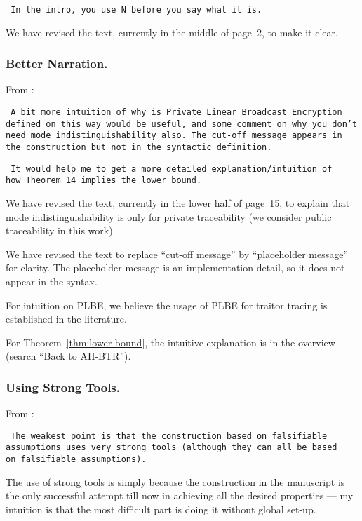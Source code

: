 \texttt{
In the intro, you use N before you say what it is.
}

We have revised the text,
currently in the middle of page~2,
to make it clear.

\subsubsection{Better Narration.}
From :

\texttt{
A bit more intuition of why is Private Linear Broadcast Encryption \\
defined on this way would be useful, and some comment on why you don't \\
need mode indistinguishability also. The cut-off message appears in \\
the construction but not in the syntactic definition.
}

\texttt{
It would help me to get a more detailed explanation/intuition of \\
how Theorem 14 implies the lower bound.
}

We have revised the text,
currently in the lower half of page~15,
to explain that mode indistinguishability is only for private traceability
(we consider public traceability in this work).

We have revised the text
to replace ``cut-off message'' by ``placeholder message''
for clarity.
The placeholder message is an implementation detail,
so it does not appear in the syntax.

For intuition on PLBE,
we believe the usage of PLBE for traitor tracing
is established in the literature.

For Theorem~\ref{thm:lower-bound},
the intuitive explanation is in the overview (search ``Back to AH-BTR'').

\subsubsection{Using Strong Tools.}
From :

\texttt{
The weakest point is that the construction based on falsifiable \\
assumptions uses very strong tools (although they can all be based \\
on falsifiable assumptions).
}

The use of strong tools is simply because the construction in the manuscript
is the only successful attempt till now in achieving
all the desired properties ---
my intuition is that the most difficult part is doing it without global set-up.

